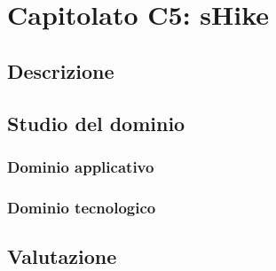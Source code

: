 %


\section{Capitolato C5: sHike}

\subsection{Descrizione}

\subsection{Studio del dominio}
\subsubsection{Dominio applicativo}
\subsubsection{Dominio tecnologico}

\subsection{Valutazione}
